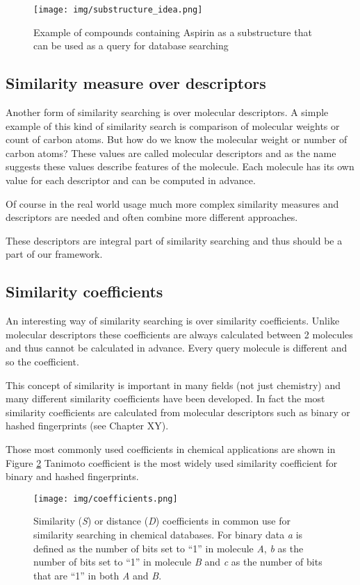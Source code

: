 \documentclass[thesis=M,english]{FITthesis}[2012/10/20]
\begin{document}
\begin{figure}
  \centering
  \texttt{[image: img/substructure\_idea.png]}
  \caption{Example of compounds containing Aspirin as a substructure that
can be used as a query for database searching}
  \label{fig:substructure_idea}
\end{figure}


\subsection{Similarity measure over descriptors}
Another form of similarity searching is over molecular descriptors. A simple example of this kind of similarity search is comparison of molecular weights or count of carbon atoms. But how do we know the molecular weight or number of carbon atoms? These values are called molecular descriptors and as the name suggests these values describe features of the molecule. Each molecule has its own value for each descriptor and can be computed in advance.

Of course in the real world usage much more complex similarity measures and descriptors are needed and often combine more different approaches.

These descriptors are integral part of similarity searching and thus should be a part of our framework.


\subsection{Similarity coefficients}
An interesting way of similarity searching is over similarity coefficients. Unlike molecular descriptors these coefficients are always calculated between 2 molecules and thus cannot be calculated in advance. Every query molecule is different and so the coefficient.

This concept of similarity is important in many fields (not just chemistry) and many different similarity coefficients have been developed. In fact the most similarity coefficients are calculated from molecular descriptors such as binary or hashed fingerprints (see Chapter XY).

Those most commonly used coefficients in chemical applications are shown in Figure \ref{fig:coefficients} Tanimoto coefficient is the most widely used similarity coefficient for binary and hashed fingerprints.\cite{intro}


\begin{figure}
  \centering
  \texttt{[image: img/coefficients.png]}
  \caption{Similarity (\textit{S}) or distance (\textit{D}) coefficients in common use for similarity searching in
chemical databases. For binary data \textit{a} is defined as the number of bits set to ``1'' in molecule \textit{A},
\textit{b} as the number of bits set to ``1''  in molecule \textit{B} and \textit{c} as the number of bits that are “1” in both
\textit{A} and \textit{B}.}
  \label{fig:coefficients}
\end{figure}
\end{document}
